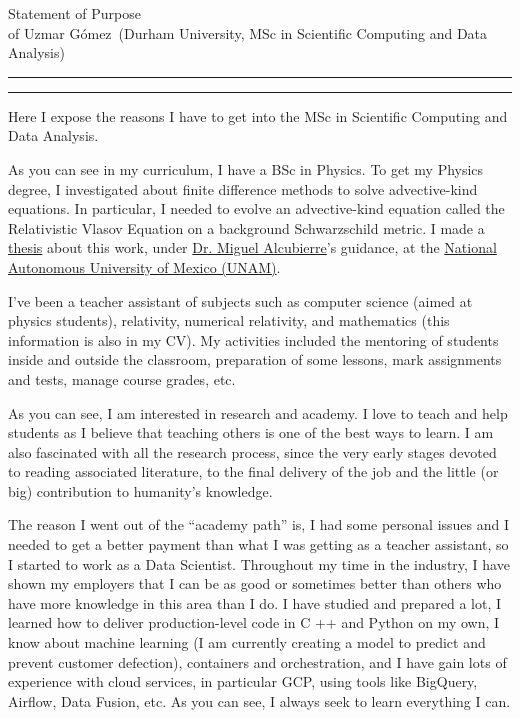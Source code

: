 \documentclass{article}
\newcommand{\soptitle}{Statement of Purpose}
\newcommand{\yourname}{Uzmar G\'omez}
\begin{document}
\begin{center}\LARGE\soptitle\\
\large of \yourname\ (Durham University, MSc in Scientific Computing and Data Analysis)
\end{center}

\hrule
\vspace{1pt}
\hrule height 1pt

\bigskip

Here I expose the reasons I have to get into the MSc in Scientific Computing and Data Analysis.

As you can see in my curriculum,  I have a BSc in Physics. To get my Physics degree, I investigated about finite difference methods to solve advective-kind equations. In particular, I needed to evolve an advective-kind equation called the Relativistic Vlasov Equation on a background Schwarzschild metric. I made a \href{http://oreon.dgbiblio.unam.mx/F/YF3LAD8UIUFR2XRPDE3H6JM2MI44M8RY8QX1RH7K429163KKEV-19694?func=find-b&request=uzmar&find_code=WRD&adjacent=N&local_base=TES01&x=65&y=13&filter_code_2=WYR&filter_request_2=&filter_code_3=WYR&filter_request_3=}{thesis} about this work, under \href{https://sigi.nucleares.unam.mx/sgiicn/people/user/view/id/8}{Dr. Miguel Alcubierre}'s guidance, at the \href{https://www.unam.mx/}{National Autonomous University of Mexico (UNAM)}. 

I've been a teacher assistant of subjects such as computer science (aimed at physics students), relativity, numerical relativity, and mathematics (this information is also in my CV). My activities included the mentoring of students inside and outside the classroom, preparation of some lessons, mark assignments and tests, manage course grades, etc. 

As you can see, I am interested in research and academy. I love to teach and help students as I believe that teaching others is one of the best ways to learn. I am also fascinated with all the research process, since the very early stages devoted to reading associated literature, to the final delivery of the job and the little (or big) contribution to humanity's knowledge. 

The reason I went out of the ``academy path'' is, I had some personal issues and I needed to get a better payment than what I was getting as a teacher assistant, so I started to work as a Data Scientist. Throughout my time in the industry, I have shown my employers that I can be as good or sometimes better than others who have more knowledge in this area than I do. I have studied and prepared a lot, I learned how to deliver production-level code in C ++ and Python on my own, I know about machine learning (I am currently creating a model to predict and prevent customer defection), containers and orchestration, and I have gain lots of experience with cloud services, in particular GCP, using tools like BigQuery, Airflow, Data Fusion, etc. As you can see, I always seek to learn everything I can.
\end{document}
